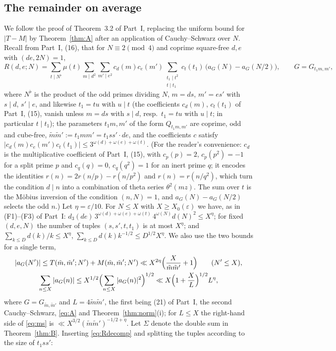 ﻿\documentclass[11pt]{amsart}
\theoremstyle{remark}
\newcommand{\e}{\varepsilon}
\begin{document}
\subsection{The remainder on average}
We follow the proof of Theorem~3.2 of Part~I, replacing the uniform bound for $|T-M|$ by Theorem~\ref{thm:A} after an application of Cauchy--Schwarz over $N$. Recall from Part~I, (16), that for $N\equiv2\pmod4$ and coprime square-free $d,e$ with $(de,2N)=1$,
\begin{equation}\label{eq:Rdecomp}
R(d,e;N)=\sum_{t\mid N^\flat}\mu(t)\sum_{m\mid d^2}\sum_{m'\mid e^2}c_d(m)c_e(m')\sum_{\substack{t_1\mid t^2\\ t\mid t_1}}c_t(t_1)\,\bigl(a_{G}(N)-a_{G}(N/2)\bigr),\qquad G=G_{t_1m,m'},
\end{equation}
where $N^\flat$ is the product of the odd primes dividing $N$, $m=ds$, $m'=es'$ with $s\mid d$, $s'\mid e$, and likewise $t_1=tu$ with $u\mid t$ (the coefficients $c_d(m)$, $c_t(t_1)$ of Part~I, (15), vanish unless $m=ds$ with $s\mid d$, resp.\ $t_1=tu$ with $u\mid t$; in particular $t\mid t_1$); the parameters $t_1m,m'$ of the form $Q_{t_1m,m'}$ are coprime, odd and cube-free, $\tilde m\tilde m':=t_1mm'=t_1ss'\cdot de$, and the coefficients $c$ satisfy $|c_d(m)c_e(m')c_t(t_1)|\le3^{\omega(d)+\omega(e)+\omega(t)}$. (For the reader's convenience: $c_d$ is the multiplicative coefficient of Part~I, (15), with $c_p(p)=2$, $c_p(p^2)=-1$ for a split prime $p$ and $c_q(q)=0$, $c_q(q^2)=1$ for an inert prime $q$; it encodes the identities $r(n)=2r(n/p)-r(n/p^2)$ and $r(n)=r(n/q^2)$, which turn the condition $d\mid n$ into a combination of theta series $\theta^2(mz)$. The sum over $t$ is the M\"obius inversion of the condition $(n,N)=1$, and $a_G(N)-a_G(N/2)$ selects the odd $n$.) Let $\eta=\e/10$. For $N\le X$ with $X\ge X_0(\e)$ we have, as in (F1)--(F3) of Part~I: $d_3(de)\,3^{\omega(d)+\omega(e)+\omega(t)}\,4^{\omega(N)}d(N)^2\le X^\eta$; for fixed $(d,e,N)$ the number of tuples $(s,s',t,t_1)$ is at most $X^\eta$; and $\sum_{k\le D}d(k)/k\le X^\eta$, $\sum_{k\le D}d(k)k^{-1/2}\le D^{1/2}X^{\eta}$. We also use the two bounds for a single term,
\begin{gather}
|a_G(N')|\le T(\tilde m,\tilde m';N')+M(\tilde m,\tilde m';N')\ll X^{2\eta}\Bigl(\frac{X}{\tilde m\tilde m'}+1\Bigr)\qquad(N'\le X),\label{eq:triv}\\
\sum_{n\le X}|a_G(n)|\le X^{1/2}\Bigl(\sum_{n\le X}|a_G(n)|^2\Bigr)^{1/2}\ll X\Bigl(1+\frac XL\Bigr)^{1/2}L^{\eta},\label{eq:ms}
\end{gather}
where $G=G_{\tilde m,\tilde m'}$ and $L=4\tilde m\tilde m'$, the first being (21) of Part~I, the second Cauchy--Schwarz, \eqref{eq:A} and Theorem~\ref{thm:norm}(i); for $L\le X$ the right-hand side of \eqref{eq:ms} is $\ll X^{3/2}(\tilde m\tilde m')^{-1/2+\eta}$. Let $\Sigma$ denote the double sum in Theorem~\ref{thm:B}. Inserting \eqref{eq:Rdecomp} and splitting the tuples according to the size of $t_1ss'$:
\end{document}
